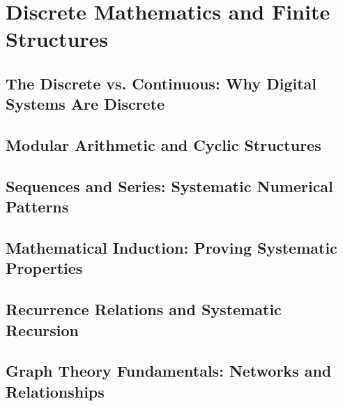 

\chapter{Discrete Mathematics and Finite Structures}

\section{The Discrete vs. Continuous: Why Digital Systems Are Discrete}

\section{Modular Arithmetic and Cyclic Structures}

\section{Sequences and Series: Systematic Numerical Patterns}

\section{Mathematical Induction: Proving Systematic Properties}

\section{Recurrence Relations and Systematic Recursion}

\section{Graph Theory Fundamentals: Networks and Relationships}
